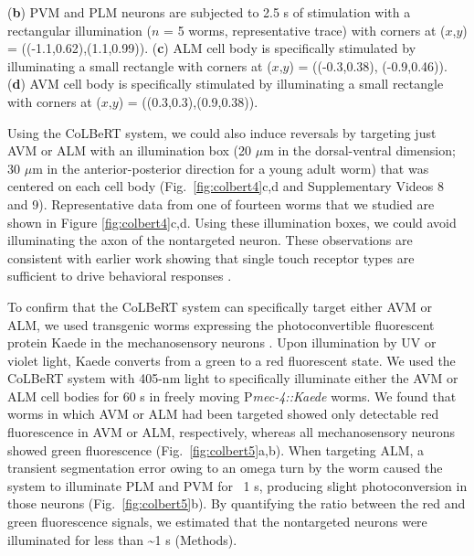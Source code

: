 \begin{FPfigure}
{(\textbf{b}) PVM and PLM neurons are subjected to 2.5 s of stimulation with a rectangular illumination ($n$ = 5 worms, representative trace) with corners at ($x$,$y$) = ((-1.1,0.62),(1.1,0.99)). (\textbf{c}) ALM cell body is specifically stimulated by illuminating a small rectangle with corners at ($x$,$y$) = ((-0.3,0.38), (-0.9,0.46)). 
(\textbf{d}) AVM cell body is specifically stimulated by illuminating a small rectangle with corners at ($x$,$y$) = ((0.3,0.3),(0.9,0.38)).\label{fig:colbert4}}
\end{FPfigure}

Using the CoLBeRT system, we could also induce reversals by targeting just AVM or ALM with an illumination box (20 $\mu$m in the dorsal-ventral dimension; 30 $\mu$m in the anterior-posterior direction for a young adult worm) that was centered on each cell body (Fig.~\ref{fig:colbert4}c,d and Supplementary Videos 8 and 9). Representative data from one of fourteen worms that we studied are shown in Figure \ref{fig:colbert4}c,d. Using these illumination boxes, we could avoid illuminating the axon of the nontargeted neuron. These observations are consistent with earlier work showing that single touch receptor types are sufficient to drive behavioral responses \citep{chalfie_developmental_1981}.

To confirm that the CoLBeRT system can specifically target either AVM or ALM, we used transgenic worms expressing the photoconvertible fluorescent protein Kaede in the mechanosensory neurons \citep{ando_optical_2002}. Upon illumination by UV or violet light, Kaede converts from a green to a red fluorescent state. We used the CoLBeRT  system with 405-nm light to specifically illuminate either the AVM or ALM cell bodies for 60 s in freely moving P\textit{mec-4::Kaede} worms. We found that worms in which AVM or ALM had been targeted showed only detectable red fluorescence in AVM or ALM, respectively, whereas all mechanosensory neurons showed green fluorescence (Fig.~\ref{fig:colbert5}a,b). When targeting ALM, a transient segmentation error owing to an omega turn by the worm caused the system to illuminate PLM and PVM for ~1 s, producing slight photoconversion in those neurons (Fig.~\ref{fig:colbert5}b). By quantifying the ratio between the red and green fluorescence signals, we estimated that the nontargeted neurons were illuminated for less than \textasciitilde1 s (Methods).

